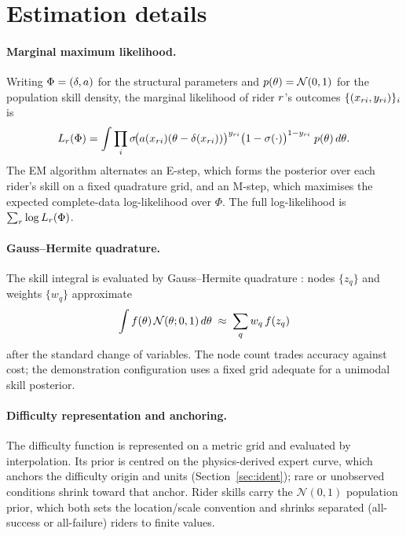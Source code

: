 \section{Estimation details}
\label{app:estimation}

\paragraph{Marginal maximum likelihood.} Writing $\Phi = (\delta, a)$ for the
structural parameters and $p(\theta) = \mathcal{N}(0,1)$ for the population skill
density, the marginal likelihood of rider $r$'s outcomes
$\{(x_{ri}, y_{ri})\}_i$ is
\begin{equation}
  L_r(\Phi) = \int \prod_i
    \sigma\!\big(a(x_{ri})(\theta - \delta(x_{ri}))\big)^{y_{ri}}
    \big(1 - \sigma(\cdot)\big)^{1 - y_{ri}}\; p(\theta)\, d\theta .
\end{equation}
The EM algorithm alternates an E-step, which forms the posterior over each rider's
skill on a fixed quadrature grid, and an M-step, which maximises the expected
complete-data log-likelihood over $\Phi$. The full log-likelihood is
$\sum_r \log L_r(\Phi)$.

\paragraph{Gauss--Hermite quadrature.} The skill integral is evaluated by
Gauss--Hermite quadrature \citep{golub1969}: nodes $\{z_q\}$ and weights
$\{w_q\}$ approximate
\begin{equation*}
  \int f(\theta)\,\mathcal{N}(\theta;0,1)\,d\theta
    \;\approx\; \sum_q w_q\, f(z_q)
\end{equation*}
after the standard change of variables. The node count
trades accuracy against cost; the demonstration configuration uses a fixed grid
adequate for a unimodal skill posterior.

\paragraph{Difficulty representation and anchoring.} The difficulty function is
represented on a metric grid and evaluated by interpolation. Its prior is centred
on the physics-derived expert curve, which anchors the difficulty origin and units
(Section~\ref{sec:ident}); rare or unobserved conditions shrink toward that
anchor. Rider skills carry the $\mathcal{N}(0,1)$ population prior, which both sets
the location/scale convention and shrinks separated (all-success or all-failure)
riders to finite values.

